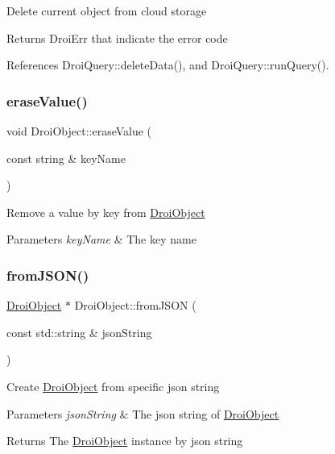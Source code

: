 Delete current object from cloud storage \begin{DoxyReturn}{Returns}
Droi\+Err that indicate the error code 
\end{DoxyReturn}


References Droi\+Query\+::delete\+Data(), and Droi\+Query\+::run\+Query().

\mbox{\label{class_droi_object_a9fef9203b220694f28b423ab4611ecad}} 
\subsubsection{\texorpdfstring{erase\+Value()}{eraseValue()}}
{\footnotesize\ttfamily void Droi\+Object\+::erase\+Value (\begin{DoxyParamCaption}\item[{const string \&}]{key\+Name }\end{DoxyParamCaption})}

Remove a value by key from \hyperlink{class_droi_object}{Droi\+Object} 
\begin{DoxyParams}{Parameters}
{\em key\+Name} & The key name \\
\hline
\end{DoxyParams}
\mbox{\label{class_droi_object_a00be8550f052b1e426969f9f0e3c0f39}} 
\subsubsection{\texorpdfstring{from\+J\+S\+O\+N()}{fromJSON()}}
{\footnotesize\ttfamily \hyperlink{class_droi_object}{Droi\+Object} $\ast$ Droi\+Object\+::from\+J\+S\+ON (\begin{DoxyParamCaption}\item[{const std\+::string \&}]{json\+String }\end{DoxyParamCaption})\hspace{0.3cm}{\ttfamily [static]}}

Create \hyperlink{class_droi_object}{Droi\+Object} from specific json string 
\begin{DoxyParams}{Parameters}
{\em json\+String} & The json string of \hyperlink{class_droi_object}{Droi\+Object} \\
\hline
\end{DoxyParams}
\begin{DoxyReturn}{Returns}
The \hyperlink{class_droi_object}{Droi\+Object} instance by json string 
\end{DoxyReturn}
\mbox{\label{class_droi_object_af6e4a33f554662af5513349036b986b4}} 
